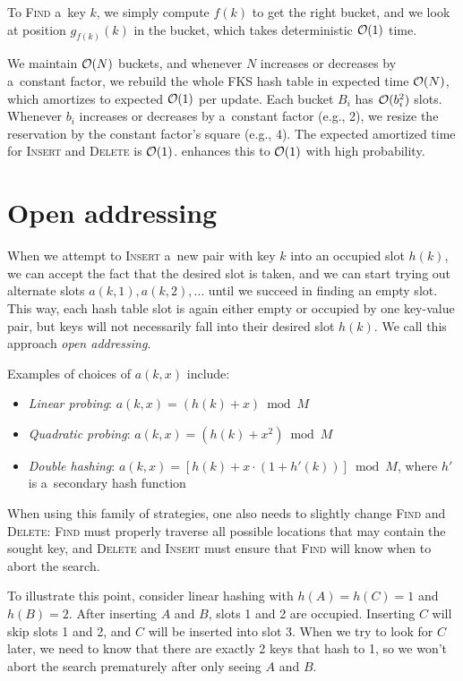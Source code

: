 To \textsc{Find} a~key $k$, we simply compute $f(k)$ to get the right bucket,
and we look at position $g_{f(k)}(k)$ in the bucket, which takes deterministic
$\mathcal{O}(1)$ time.

We maintain $\mathcal{O}(N)$ buckets, and whenever $N$ increases or decreases by
a~constant factor, we rebuild the whole FKS hash table in expected time
$\mathcal{O}(N)$, which amortizes to expected $\mathcal{O}(1)$ per update. Each bucket $B_i$
has $\mathcal{O}(b_i^2)$ slots. Whenever $b_i$ increases or decreases by a~constant
factor (e.g., 2), we resize the reservation by the constant factor's square
(e.g., 4).
The expected amortized time for \textsc{Insert} and \textsc{Delete} is $\mathcal{O}(1)$.
\cite{univ-class-of-hfns} enhances this to $\mathcal{O}(1)$ with high probability.

\section{Open addressing}
\label{sec:open-addressing}
When we attempt to \textsc{Insert} a~new pair with key $k$ into an occupied slot
$h(k)$, we can accept the fact that the desired slot is taken, and we can start
trying out alternate slots $a(k,1), a(k,2), \ldots$ until we succeed in
finding an empty slot. This way, each hash table slot is again either empty or
occupied by one key-value pair, but keys will not necessarily fall into their
desired slot $h(k)$.
We call this approach \emph{open addressing}.

Examples of choices of $a(k,x)$ include:
\begin{itemize}
\item \emph{Linear probing}: $a(k,x)=(h(k)+x) \bmod M$
\item \emph{Quadratic probing}: $a(k,x)=(h(k)+x^2) \bmod M$
\item \emph{Double hashing}: $a(k,x)=[h(k)+x\cdot (1+h'(k))]\bmod M$, where
	$h'$ is a~secondary hash function
\end{itemize}

When using this family of strategies, one also needs to slightly change
\textsc{Find} and \textsc{Delete}: \textsc{Find} must properly traverse
all possible locations that may contain the sought key, and \textsc{Delete}
and \textsc{Insert} must ensure that \textsc{Find} will know when to abort
the search.

To illustrate this point, consider linear hashing with $h(A)=h(C)=1$ and
$h(B)=2$. After inserting $A$ and $B$, slots 1 and 2 are occupied.
Inserting $C$ will skip slots 1 and 2, and $C$ will be inserted into slot 3.
When we try to look for $C$ later, we need to know that there are exactly 2 keys
that hash to 1, so we won't abort the search prematurely after only seeing
$A$ and $B$.


